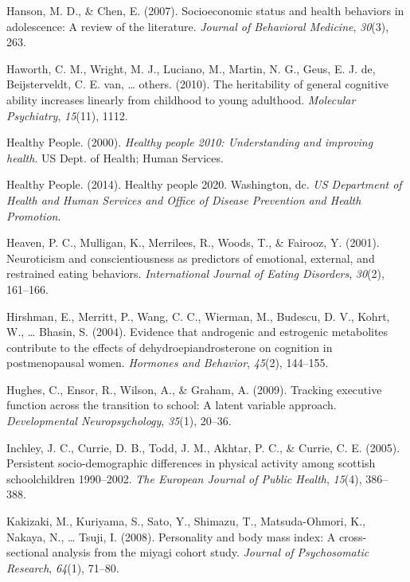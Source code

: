 \documentclass[man]{apa6}
\begin{document}
\leavevmode\hypertarget{ref-hanson2007socioeconomic}{}%
Hanson, M. D., \& Chen, E. (2007). Socioeconomic status and health behaviors in adolescence: A review of the literature. \emph{Journal of Behavioral Medicine}, \emph{30}(3), 263.

\leavevmode\hypertarget{ref-haworth2010heritability}{}%
Haworth, C. M., Wright, M. J., Luciano, M., Martin, N. G., Geus, E. J. de, Beijsterveldt, C. E. van, \ldots{} others. (2010). The heritability of general cognitive ability increases linearly from childhood to young adulthood. \emph{Molecular Psychiatry}, \emph{15}(11), 1112.

\leavevmode\hypertarget{ref-healthy2000healthy}{}%
Healthy People. (2000). \emph{Healthy people 2010: Understanding and improving health}. US Dept. of Health; Human Services.

\leavevmode\hypertarget{ref-us2014healthy}{}%
Healthy People. (2014). Healthy people 2020. Washington, dc. \emph{US Department of Health and Human Services and Office of Disease Prevention and Health Promotion}.

\leavevmode\hypertarget{ref-heaven2001neuroticism}{}%
Heaven, P. C., Mulligan, K., Merrilees, R., Woods, T., \& Fairooz, Y. (2001). Neuroticism and conscientiousness as predictors of emotional, external, and restrained eating behaviors. \emph{International Journal of Eating Disorders}, \emph{30}(2), 161--166.

\leavevmode\hypertarget{ref-hirshman2004evidence}{}%
Hirshman, E., Merritt, P., Wang, C. C., Wierman, M., Budescu, D. V., Kohrt, W., \ldots{} Bhasin, S. (2004). Evidence that androgenic and estrogenic metabolites contribute to the effects of dehydroepiandrosterone on cognition in postmenopausal women. \emph{Hormones and Behavior}, \emph{45}(2), 144--155.

\leavevmode\hypertarget{ref-hughes2009tracking}{}%
Hughes, C., Ensor, R., Wilson, A., \& Graham, A. (2009). Tracking executive function across the transition to school: A latent variable approach. \emph{Developmental Neuropsychology}, \emph{35}(1), 20--36.

\leavevmode\hypertarget{ref-inchley2005persistent}{}%
Inchley, J. C., Currie, D. B., Todd, J. M., Akhtar, P. C., \& Currie, C. E. (2005). Persistent socio-demographic differences in physical activity among scottish schoolchildren 1990--2002. \emph{The European Journal of Public Health}, \emph{15}(4), 386--388.

\leavevmode\hypertarget{ref-kakizaki2008personality}{}%
Kakizaki, M., Kuriyama, S., Sato, Y., Shimazu, T., Matsuda-Ohmori, K., Nakaya, N., \ldots{} Tsuji, I. (2008). Personality and body mass index: A cross-sectional analysis from the miyagi cohort study. \emph{Journal of Psychosomatic Research}, \emph{64}(1), 71--80.
\end{document}
